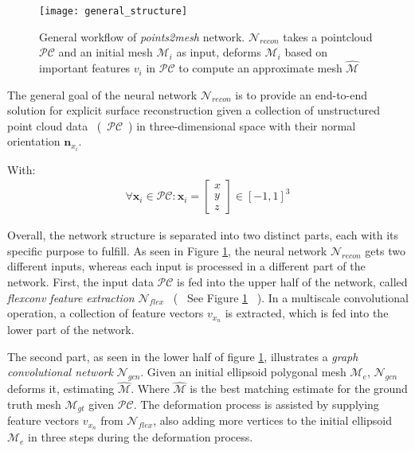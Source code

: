 \begin{figure}
   \begin{center}
   \texttt{[image: general\_structure]}
   \caption{General workflow of \emph{points2mesh} network. $\mathcal{N}_{recon}$ takes a pointcloud $\mathcal{PC}$ and an initial mesh $\mathcal{M}_i$
   as input, deforms $\mathcal{M}_i$ based on important features $v_i$ in $\mathcal{PC}$ to compute an approximate mesh $\hat{\mathcal{M}}$}
   \label{fig:generalconfig}
   \end{center}
 \end{figure}
 The general goal of the neural network $\mathcal{N}_{recon}$ is to provide an end-to-end solution for 
 explicit surface reconstruction given a collection of unstructured point cloud data ~(~$\mathcal{PC}$~) in three-dimensional 
 space with their normal orientation $\textbf{n}_{x_i}$. 

 With:
 \begin{align}
      \forall \textbf{x}_i \in \mathcal{PC} : 
      \textbf{x}_i =
      \begin{bmatrix}
            x \\
            y\\
            z
          \end{bmatrix} \in [-1,1]^3
   \end{align}

   Overall, the network structure is separated into two distinct parts,
   each with its specific purpose to fulfill. As seen in Figure \ref{fig:generalconfig}, the neural 
   network $\mathcal{N}_{recon}$ gets two different inputs, whereas each input is processed in a different part of the network.
   First, the input data $\mathcal{PC}$ is fed into the upper half of the network, called \emph{flexconv feature extraction}
   $\mathcal{N}_{flex}$ ~(~ See Figure \ref{fig:generalconfig} ~). In a multiscale convolutional operation,
   a collection of feature vectors $v_{x_n}$ is extracted, 
   which is fed into the lower part of the network.

   The second part, as seen in the lower half of figure \ref{fig:generalconfig}, illustrates 
   a \emph{graph convolutional network} $\mathcal{N}_{gcn}$. Given an initial ellipsoid
   polygonal mesh $\mathcal{M}_{e}$, $\mathcal{N}_{gcn}$ deforms it, estimating $\hat{\mathcal{M}}$.
   Where $\hat{\mathcal{M}}$ is the best matching estimate for the ground truth mesh $\mathcal{M}_{gt}$ given $\mathcal{PC}$.
   The deformation process is assisted by supplying feature vectors $v_{x_n}$ from $\mathcal{N}_{flex}$, also adding more
   vertices to the initial ellipsoid $\mathcal{M}_{e}$ in three steps during the deformation process.

